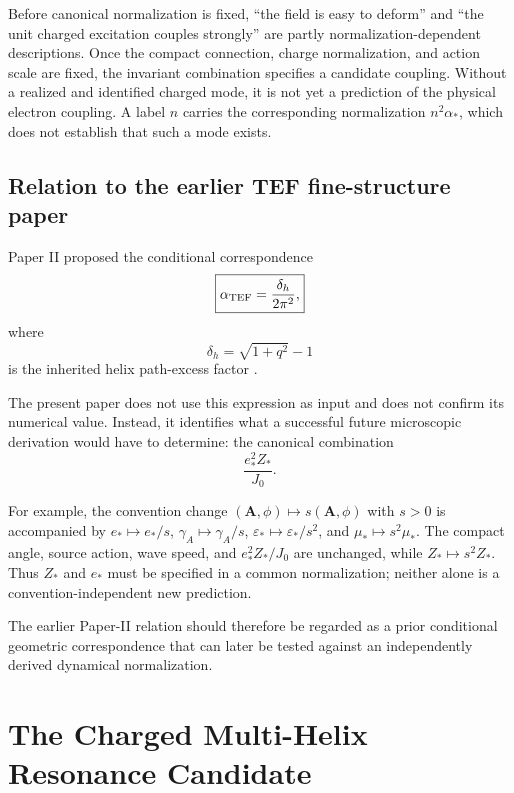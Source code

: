 \documentclass[11pt]{article}
\begin{document}
Before canonical normalization is fixed, ``the field is easy to deform'' and ``the unit charged excitation couples strongly'' are partly normalization-dependent descriptions. Once the compact connection, charge normalization, and action scale are fixed, the invariant combination specifies a candidate coupling. Without a realized and identified charged mode, it is not yet a prediction of the physical electron coupling. A label $n$ carries the corresponding normalization $n^2\alpha_*$, which does not establish that such a mode exists.

\subsection{Relation to the earlier TEF fine-structure paper}

Paper II proposed the conditional correspondence
\begin{equation}
\boxed{
\alpha_{\rm TEF}
=
\frac{\delta_h}{2\pi^2},
}
\end{equation}
where
\begin{equation}
\delta_h
=
\sqrt{1+q^2}-1
\end{equation}
is the inherited helix path-excess factor \cite{wu2026fine}.

The present paper does not use this expression as input and does not confirm its numerical value. Instead, it identifies what a successful future microscopic derivation would have to determine: the canonical combination
\begin{equation}
\frac{e_*^2Z_*}{J_0}.
\end{equation}

For example, the convention change $(\mathbf A,\phi)\mapsto s(\mathbf A,\phi)$ with $s>0$ is accompanied by $e_*\mapsto e_*/s$, $\gamma_A\mapsto\gamma_A/s$, $\varepsilon_*\mapsto\varepsilon_*/s^2$, and $\mu_*\mapsto s^2\mu_*$. The compact angle, source action, wave speed, and $e_*^2Z_*/J_0$ are unchanged, while $Z_*\mapsto s^2Z_*$. Thus $Z_*$ and $e_*$ must be specified in a common normalization; neither alone is a convention-independent new prediction.

The earlier Paper-II relation should therefore be regarded as a prior conditional geometric correspondence that can later be tested against an independently derived dynamical normalization.

\section{The Charged Multi-Helix Resonance Candidate}
\label{sec:chargedcandidate}
\end{document}
